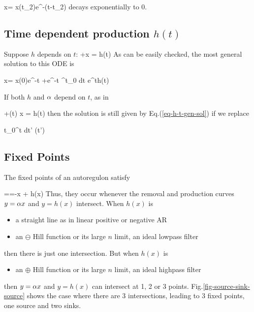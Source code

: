 \beq
x= x(t_2)e^{-\alp (t-t_2)}
\eeq
 decays exponentially to 0.
 
\subsection{Time dependent production $h(t)$}

Suppose $h$ depends on $t$:
\beq
{} +\alp x = h(t)
\eeq
As can be easily checked,
the most general solution to this ODE is


\beq
x=
x(0)e^{-\alp t}
+e^{-\alp t}
\int^t_0 dt\;
e^{\alp t}h(t)
\label{eq-h-t-gen-sol}
\eeq

If both $h$ and $\alpha$ depend on $t$,
as in

\beq
{} +\alp(t) x = h(t)
\eeq
then the solution is still 
given by Eq.(\ref{eq-h-t-gen-sol})
if we replace
 

\beq
\alp t\rarrow \int_0^t dt'\; \alp(t')
\eeq



\subsection{Fixed Points}

The fixed points of an autoregulon satisfy

==-\alp x + h(x)
\eeq
Thus, they occur whenever the removal and production curves
$y=\alpha x$ and $y=h(x)$ intersect. When $h(x)$ is 

\begin{itemize}
\item
a straight line as in 
linear positive or negative
AR
\item an $\ominus$ Hill function or 
its large $n $ limit, an ideal lowpass filter
\end{itemize}
then
there is just one intersection. But when
$h(x)$ is 

\begin{itemize}
\item an $\oplus$ Hill function or 
its large $n $ limit, an ideal highpass filter
\end{itemize}
then
$y=\alpha x$ and $y=h(x)$ can intersect at 1, 2 or 3 points.
Fig.\ref{fig-source-sink-source} shows 
the case where there are 3 intersections, leading to 3 fixed points,
one source and two sinks.

